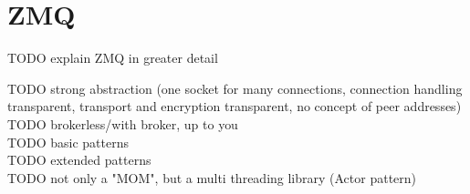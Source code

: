\chapter{ZMQ}\label{ch:zmq}
TODO explain ZMQ in greater detail

TODO strong abstraction (one socket for many connections, connection handling transparent, transport and encryption transparent, no concept of peer addresses)\\
TODO brokerless/with broker, up to you\\
TODO basic patterns\\
TODO extended patterns\\
TODO not only a "MOM", but a multi threading library (Actor pattern)\\
